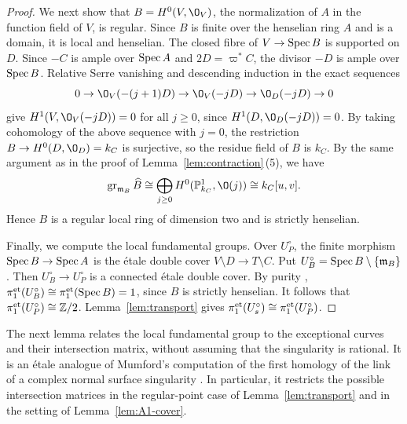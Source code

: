 \begin{proof}
We next show that $B = H^0(V,\O_V)$, the normalization of $A$ in the function field of $V$, is regular.
Since $B$ is finite over the henselian ring $A$ and is a domain, it is local and henselian.
The closed fibre of $V\to\operatorname{Spec} B$ is supported on $D$.
Since $-C$ is ample over $\operatorname{Spec} A$ and $2D = \varpi^*C$, the divisor $-D$ is ample over $\operatorname{Spec} B$.
Relative Serre vanishing and descending induction in the exact sequences
\[
  0\to\O_V(-(j+1)D)\to\O_V(-jD)\to\O_D(-jD)\to 0
\]
give $H^1(V,\O_V(-jD)) = 0$ for all $j\geq 0$, since $H^1(D,\O_D(-jD)) = 0$.
By taking cohomology of the above sequence with $j = 0$, the restriction $B\to H^0(D,\O_D) = k_C$ is surjective, so the residue field of $B$ is $k_C$.
By the same argument as in the proof of Lemma~\ref{lem:contraction}\,(5), we have
\[
  \operatorname{gr}_{\mathfrak m_B}\widehat B
  \cong\bigoplus_{j\geq 0}H^0(\PP^1_{k_C},\O(j))
  \cong k_C[u,v].
\]
Hence $B$ is a regular local ring of dimension two and is strictly henselian.

Finally, we compute the local fundamental groups.
Over $U_P^\circ$, the finite morphism $\operatorname{Spec} B\to\operatorname{Spec} A$ is the \'etale double cover $V\setminus D\to T\setminus C$.
Put $U_B^\circ = \operatorname{Spec} B\setminus\{\mathfrak m_B\}$.
Then $U_B^\circ\to U_P^\circ$ is a connected \'etale double cover.
By purity \cite[Exp.~X, Corollaire~3.3]{SGA1}, $\pi_1^{\rm et}(U_B^\circ)\cong\pi_1^{\rm et}(\operatorname{Spec} B) = 1$, since $B$ is strictly henselian.
It follows that $\pi_1^{\rm et}(U_P^\circ)\cong\mathbb{Z}/2$.
Lemma~\ref{lem:transport} gives $\pi_1^{\rm et}(U_s^\circ)\cong\pi_1^{\rm et}(U_P^\circ)$.
\end{proof}

The next lemma relates the local fundamental group to the exceptional curves and their intersection matrix, without assuming that the singularity is rational.
It is an \'etale analogue of Mumford's computation of the first homology of the link of a complex normal surface singularity \cite[Part~I, pp.~10--11]{Mum61}.
In particular, it restricts the possible intersection matrices in the regular-point case of Lemma~\ref{lem:transport} and in the setting of Lemma~\ref{lem:A1-cover}.

